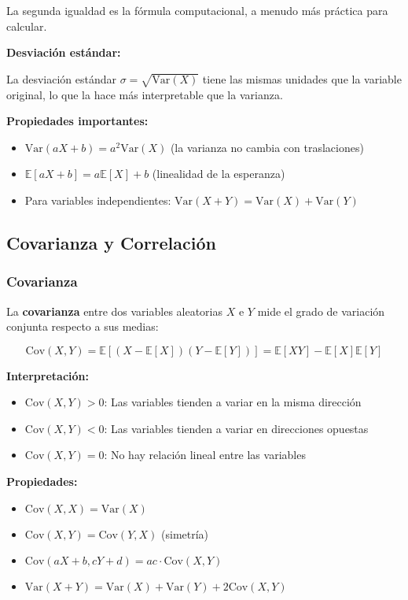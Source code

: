 \documentclass[12pt,a4paper]{article}
\begin{document}
La segunda igualdad es la fórmula computacional, a menudo más práctica para calcular.

\textbf{Desviación estándar:}

La desviación estándar $\sigma = \sqrt{\mathrm{Var}(X)}$ tiene las mismas unidades que la variable original, lo que la hace más interpretable que la varianza.

\textbf{Propiedades importantes:}
\begin{itemize}
    \item $\mathrm{Var}(aX + b) = a^2 \mathrm{Var}(X)$ (la varianza no cambia con traslaciones)
    \item $\mathbb{E}[aX + b] = a\mathbb{E}[X] + b$ (linealidad de la esperanza)
    \item Para variables independientes: $\mathrm{Var}(X + Y) = \mathrm{Var}(X) + \mathrm{Var}(Y)$
\end{itemize}

\subsection{Covarianza y Correlación}

\subsubsection{Covarianza}

La \textbf{covarianza} entre dos variables aleatorias $X$ e $Y$ mide el grado de variación conjunta respecto a sus medias:

\begin{equation}
    \mathrm{Cov}(X,Y) = \mathbb{E}[(X - \mathbb{E}[X])(Y - \mathbb{E}[Y])] = \mathbb{E}[XY] - \mathbb{E}[X]\mathbb{E}[Y]
\end{equation}

\textbf{Interpretación:}
\begin{itemize}
    \item $\mathrm{Cov}(X,Y) > 0$: Las variables tienden a variar en la misma dirección
    \item $\mathrm{Cov}(X,Y) < 0$: Las variables tienden a variar en direcciones opuestas
    \item $\mathrm{Cov}(X,Y) = 0$: No hay relación lineal entre las variables
\end{itemize}

\textbf{Propiedades:}
\begin{itemize}
    \item $\mathrm{Cov}(X,X) = \mathrm{Var}(X)$
    \item $\mathrm{Cov}(X,Y) = \mathrm{Cov}(Y,X)$ (simetría)
    \item $\mathrm{Cov}(aX + b, cY + d) = ac \cdot \mathrm{Cov}(X,Y)$
    \item $\mathrm{Var}(X + Y) = \mathrm{Var}(X) + \mathrm{Var}(Y) + 2\mathrm{Cov}(X,Y)$
\end{itemize}
\end{document}

